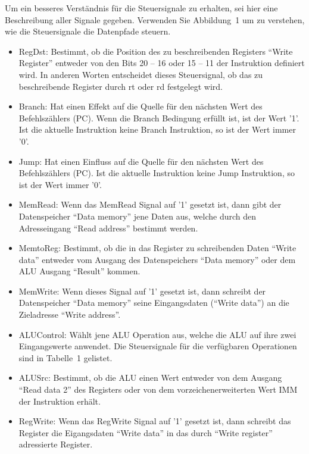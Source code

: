 \documentclass[a4paper,12pt]{article}
\begin{document}
Um ein besseres Verst\"andnis f\"ur die Steuersignale zu erhalten, sei hier eine Beschreibung aller Signale gegeben. Verwenden Sie Abbildung~1 um zu verstehen, wie die Steuersignale die Datenpfade steuern.
\begin{itemize}

	\item{RegDst: Bestimmt, ob die Position des zu beschreibenden Registers "`Write Register"' entweder von den Bits 20 -- 16 oder 15 -- 11 der Instruktion definiert wird. In anderen Worten entscheidet dieses Steuersignal, ob das zu beschreibende Register durch rt oder rd festgelegt wird.}

	\item{Branch: Hat einen Effekt auf die Quelle f\"ur den n\"achsten Wert des Befehlsz\"ahlers (PC). Wenn die Branch Bedingung erf\"ullt ist, ist der Wert '1'. Ist die aktuelle Instruktion keine Branch Instruktion, so ist der Wert immer '0'.}

	\item{Jump: Hat einen Einfluss auf die Quelle f\"ur den n\"achsten Wert des Befehlsz\"ahlers (PC). Ist die aktuelle Instruktion keine Jump Instruktion, so ist der Wert immer '0'.}

	\item{MemRead: Wenn das MemRead Signal auf '1' gesetzt ist, dann gibt der Datenspeicher "`Data memory"' jene Daten aus, welche durch den Adresseingang "`Read address"' bestimmt werden.}

	\item{MemtoReg: Bestimmt, ob die in das Register zu schreibenden Daten "`Write data"' entweder vom Ausgang des Datenspeichers "`Data memory"' oder dem ALU Ausgang "`Result"' kommen.}

	\item{MemWrite: Wenn dieses Signal auf '1' gesetzt ist, dann schreibt der Datenspeicher "`Data memory"' seine Eingangsdaten ("`Write data"') an die Zieladresse "`Write address"'.}

	\item{ALUControl: W\"ahlt jene ALU Operation aus, welche die ALU auf ihre zwei Eingangswerte anwendet. Die Steuersignale f\"ur die verf\"ugbaren Operationen sind in Tabelle~1 gelistet.}

	\item{ALUSrc: Bestimmt, ob die ALU einen Wert entweder von dem Ausgang "`Read data 2"' des Registers oder von dem vorzeichenerweiterten Wert IMM der Instruktion erh\"alt.}

	\item{RegWrite: Wenn das RegWrite Signal auf '1' gesetzt ist, dann schreibt das Register die Eigangsdaten "`Write data"' in das durch "`Write register"' adressierte Register.\\}

\end{itemize}
\end{document}
